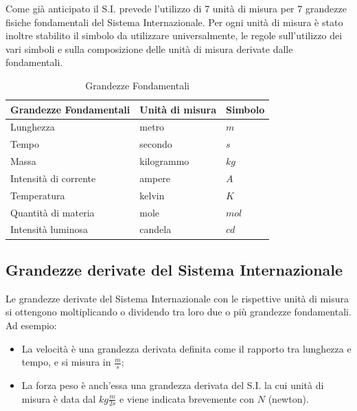 \documentclass{report}
\begin{document}
Come già anticipato il S.I. prevede l'utilizzo di 7 unità di misura per 7 grandezze fisiche fondamentali del Sistema Internazionale. Per ogni unità di misura è stato inoltre stabilito il simbolo da utilizzare universalmente, le regole sull'utilizzo dei vari simboli e sulla composizione delle unità di misura derivate dalle fondamentali.
\\
\begin{table}[h]
  \caption{Grandezze Fondamentali}\label{tab:}
  \begin{center}
    \begin{tabular}[c]{|l|l|l|}
      \hline
      Grandezze Fondamentali & Unità di misura & Simbolo \\
      \hline
      Lunghezza & metro & $m$ \\
      \hline
      Tempo & secondo & $s$ \\
      \hline 
      Massa & kilogrammo & $kg$ \\
      \hline
      Intensità di corrente & ampere & $A$ \\
      \hline 
      Temperatura & kelvin & $K$ \\
      \hline 
      Quantità di materia & mole & $mol$ \\
      \hline
      Intensità luminosa & candela & $cd$ \\
      \hline
    \end{tabular}
  \end{center}
\end{table}


\subsection{Grandezze derivate del Sistema Internazionale} %
\label{sub:Grandezze derivate del Sistema Internazionale}
Le grandezze derivate del Sistema Internazionale con le rispettive unità di misura si ottengono moltiplicando o dividendo tra loro due o più grandezze fondamentali. Ad esempio:
\begin{itemize}
  \item{La velocità è una grandezza derivata definita come il rapporto tra lunghezza e tempo, e si misura in $\frac{m}{s}$;}
  \item{La forza peso è anch'essa una grandezza derivata del S.I. la cui unità di misura è data dal $kg\frac{m}{2s}$ e viene indicata brevemente con $N$ (newton).}
\end{itemize}
\end{document}

